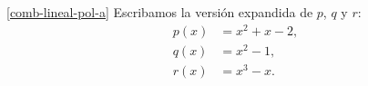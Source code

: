 \begin{enumerate}[resume, topsep=6pt, itemsep=.4cm]
    \ref{comb-lineal-pol-a} Escribamos la versión expandida de $p$, $q$ y $r$:
    \begin{align*}
        p(x)&=x^2+x-2,\\
        q(x)&=x^2-1,\\
        r(x)&=x^3-x.                
    \end{align*}
    \begin{comment}
    Debemos encontrar el subespacio generado por estos tres polinomios. Primero encontraremos una base del subespacio en término de los generadores canónicos  ($x^n$ con $n\in\mathbb{N}_0$). 
    \begin{align*}
        &\begin{bmatrix}
            0 & 1 & 1 & -2 \\
            0 & 1 & 0 & -1 \\
            1 & 0 & -1 & 0 \\
        \end{bmatrix}
        \stackrel{F_2-F_1}{\longrightarrow}
        \begin{bmatrix}
            0 & 1 & 1 & -2 \\
            0 & 0 & -1 & 1 \\
            1 & 0 & -1 & 0 \\
        \end{bmatrix} \\
        &\underset{F_3-F_2}{\stackrel{F_1+F_2}{\longrightarrow}}
        \begin{bmatrix}
            0 & 1 & 0 & -1 \\
            0 & 0 & -1 & 1 \\
            1 & 0 & 0 & -1 \\
        \end{bmatrix} \stackrel{-F_2}{\longrightarrow}
        \begin{bmatrix}
            0 & 1 & 0 & -1 \\
            0 & 0 & 1 & -1 \\
            1 & 0 & 0 & -1 \\
        \end{bmatrix}.            
    \end{align*}
    Luego  
    $$
    \langle p,q,r\rangle = \langle x^2-1,x-1,x^3-1 \rangle.
    $$
\end{comment}




\end{enumerate}
